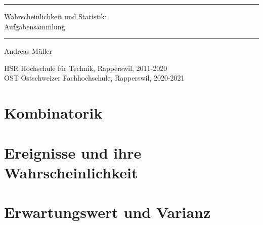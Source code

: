 \documentclass[a4paper,12pt]{book}
\begin{document}
\pagestyle{fancy}
\rhead{}
\frontmatter
\newcommand\HRule{\noindent\rule{\linewidth}{1.5pt}}
\begin{titlepage}
\HRule
\vspace*{2pt}
\begin{flushright}
{\Huge
Wahrscheinlichkeit und Statistik:\\
\bigskip
Aufgabensammlung}
\end{flushright}
\HRule
\begin{flushright}
\vspace{30pt}
\LARGE
Andreas Müller
\end{flushright}
\begin{center}
HSR Hochschule für Technik, Rapperswil, 2011-2020\\
OST Ostschweizer Fachhochschule, Rapperswil, 2020-2021
\end{center}
\end{titlepage}
\hypersetup{
        linktoc=all,
        linkcolor=blue
}
\tableofcontents
\newenvironment{beispiel}[1][Beispiel]{%
\begin{proof}[#1]%
\renewcommand{\qedsymbol}{$\bigcirc$}
}{\end{proof}}
\mainmatter

\openthemaindex
{}

\chapter{Kombinatorik}

\chapter{Ereignisse und ihre Wahrscheinlichkeit}

%
\chapter{Erwartungswert und Varianz}

\end{document}
